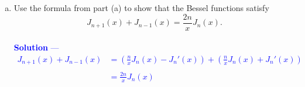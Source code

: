 \documentclass[12pt]{article}
\begin{document}
\begin{enumerate}[(a)]
{\begin{align*}
&= J_{n+1}(x) \;\;\; \text{OR} \;\;\; J_{n-1}(x) \\ \\
&= J_{n \pm 1}(x) \\ \\
\end{align*}
}
\item Use the formula from part (a) to show that the Bessel functions satisfy
$$J_{n+1}(x)  + J_{n-1}(x) = \frac{2n}{x} J_n(x).$$ \\  \textcolor{blue}{\textbf{Solution} — 
\begin{align*}
J_{n+1}(x)  + J_{n-1}(x) &= \left( \frac{n}{x} J_n(x) - J_n'(x) \right) + \left( \frac{n}{x} J_n(x) + J_n'(x) \right) \\ \\
&=  \frac{2n}{x} J_n(x)
\end{align*}}
\end{enumerate}
\end{document}
